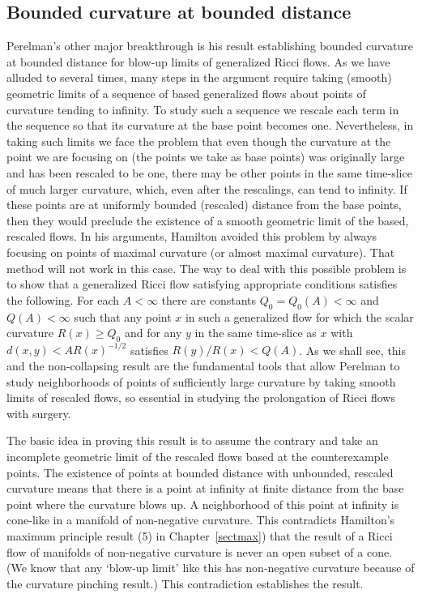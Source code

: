 \subsection{Bounded curvature at bounded distance}

Perelman's other major breakthrough is his result establishing
bounded curvature at bounded distance for blow-up limits of
generalized Ricci flows. As we have alluded to several times, many
steps in the argument require taking (smooth) geometric limits of a
sequence of based generalized flows about points of curvature
tending to infinity.  To study  such a sequence we rescale each term
in the sequence so that its curvature at the base point becomes one.
Nevertheless, in taking such limits we face the problem that even
though the curvature at the point we are focusing on (the points we
take as base points) was originally large and has been  rescaled to
be one, there may be other points in the same time-slice of much
larger curvature, which, even after the rescalings, can tend to
infinity.
 If
these points are  at uniformly bounded (rescaled) distance from the
base points, then they would preclude the existence of a smooth
geometric limit of the based, rescaled flows. In his arguments,
Hamilton avoided this problem by always focusing on points of
maximal curvature (or almost maximal curvature). That method will
not work in this case. The way to deal with this possible problem is
to show that a generalized Ricci flow satisfying appropriate
conditions satisfies the following. For each $A<\infty$ there are
constants $Q_0=Q_0(A)<\infty$ and $Q(A)<\infty$ such that any point
$x$ in such a generalized flow for which the scalar curvature
$R(x)\ge Q_0$ and for any $y$ in the same time-slice as $x$ with
$d(x,y)<AR(x)^{-1/2}$ satisfies $R(y)/R(x)<Q(A)$. As we shall see,
this and the non-collapsing result are the fundamental tools that
allow Perelman to study neighborhoods of points of sufficiently
large curvature by taking smooth limits of rescaled flows, so
essential in studying the prolongation of Ricci flows with surgery.

The basic idea in proving this result is to assume the contrary and
take an incomplete geometric limit of the rescaled flows based at
the counterexample points. The existence of points at bounded
distance with unbounded, rescaled curvature means that there is a
point at infinity at finite distance from the base point where the
curvature blows up. A neighborhood of this point at infinity is
cone-like in a manifold of non-negative curvature. This contradicts
Hamilton's maximum principle result (5) in Chapter~\ref{sectmax})
that the result of a Ricci flow of manifolds of non-negative
curvature is never an open subset of a cone. (We know that any
`blow-up limit' like this has non-negative curvature because of the
curvature pinching result.) This contradiction establishes the
result.



